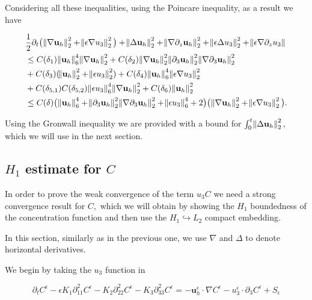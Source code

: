 \documentclass[11pt]{article}
\begin{document}
Considering all these inequalities, using the Poincare inequality, as a result we have

\begin{equation}
  \begin{split}
& \frac{1}{2} \partial_t  \big( \norm{\nabla \mathbf{u}_h}^2_2 + \norm{\epsilon \nabla u_3}^2_2 \big ) + \norm{\Delta \mathbf{u}_h}^2_2 + \norm{\nabla \partial_z \mathbf{u}_h}^2_2 + \norm{\epsilon \Delta u_3}^2_2 + \norm{\epsilon \nabla \partial_z u_3} \\
& \leq C(\delta_1) \norm{\mathbf{u}_h}^4_6 \norm{\nabla \mathbf{u}_h}_2^2 + C(\delta_2) \norm{\nabla \mathbf{u}_h}_2^2 \norm{\partial_3 \mathbf{u}_h}^2_2 \norm{\nabla \partial_3 \mathbf{u}_h}^2_2 \\
& + C(\delta_3) (\norm{ \mathbf{u}_h}^2_2 + \norm{ \epsilon u_3}^2_2) + C(\delta_4) \norm{\mathbf{u}_h}^4_6 \norm{\epsilon \nabla u_3}^2_2 \\
& + C(\delta_{5,1}) C(\delta_{5,2}) \norm{\epsilon u_3}^4_6 \norm{\nabla \mathbf{u}_h}^2_2 + C(\delta_6) \norm{\mathbf{u}_h}_2^2 \\
& \leq C(\delta) \big ( \norm{\mathbf{u}_h}^4_6 +\norm{\partial_3 \mathbf{u}_h}^2_2 \norm{\nabla \partial_3 \mathbf{u}_h}^2_2 + \norm{\epsilon u_3}^4_6 + 2 \big) \big( \norm{\nabla \mathbf{u}_h}^2_2 + \norm{\epsilon \nabla u_3}^2_2 \big ).
  \end{split}
\end{equation}

Using the Gronwall inequality we are provided with a bound for $\int_0^t \norm{\Delta \mathbf{u}_h}^2_2,$ which we will use in the next section.


\subsection{$H_1$ estimate for $C$}

In order to prove the weak convergence of the term $u_3 C$ we need a strong convergence result for $C,$ which we will obtain by showing the $H_1$ boundedness of the concentration function and then use the $H_1 \hookrightarrow L_2$ compact embedding.

In this section, similarly as in the previous one, we use $\nabla$ and $\Delta$ to denote horizontal derivatives.

We begin by taking the $u_3$ function in

\begin{equation}
  \partial_t C^\epsilon - \epsilon K_1 \partial_{11} ^ 2 C^\epsilon - K_2 \partial_{22} ^ 2 C^\epsilon - K_3 \partial_{33} ^ 2 C^\epsilon = - \mathbf{u}_h^\epsilon \cdot \nabla C^\epsilon - u_3^\epsilon \cdot \partial_3 C^\epsilon + S_\epsilon
\end{equation}
\end{document}
